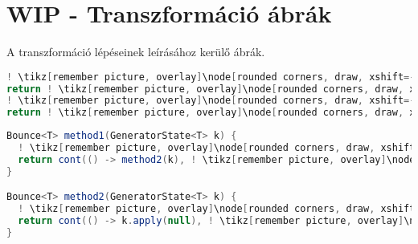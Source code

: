 \chapter*{WIP - Transzformáció ábrák}

A transzformáció lépéseinek leírásához kerülő ábrák.

\begin{center}
\begin{mdframed}
\begin{minipage}[t]{0.4\textwidth}
\begin{lstlisting}[language=Java, numbers=none, breaklines=true]
! \tikz[remember picture, overlay]\node[rounded corners, draw, xshift=-0.1cm, inner sep=5pt, anchor=west] {Kódrészlet \#1}; \vspace*{0.5cm} ! 
return ! \tikz[remember picture, overlay]\node[rounded corners, draw, xshift=-0.1cm, inner sep=5pt, anchor=west, yshift=0.1cm] {Kifejezés \#1}; \vspace*{0.3cm} !
! \tikz[remember picture, overlay]\node[rounded corners, draw, xshift=-0.1cm, inner sep=5pt, anchor=west] {Kódrészlet \#2}; \vspace*{0.5cm} ! 
return ! \tikz[remember picture, overlay]\node[rounded corners, draw, xshift=-0.1cm, inner sep=5pt, anchor=west, yshift=0.1cm] {Kifejezés \#2}; \vspace*{0.3cm} !
\end{lstlisting}
\end{minipage} 
\begin{minipage}[t]{0.6\textwidth}
\begin{lstlisting}[language=Java, numbers=none, breaklines=true]
Bounce<T> method1(GeneratorState<T> k) {
  ! \tikz[remember picture, overlay]\node[rounded corners, draw, xshift=-0.1cm, inner sep=5pt, anchor=west] {Kódrészlet \#1}; \vspace*{0.3cm} !
  return cont(() -> method2(k), ! \tikz[remember picture, overlay]\node[rounded corners, draw, xshift=-0.1cm, inner sep=5pt, anchor=west, yshift=0.1cm] {Kifejezés \#1}; \vspace*{0.2cm} \hspace*{1.75cm} !);
}

Bounce<T> method2(GeneratorState<T> k) {
  ! \tikz[remember picture, overlay]\node[rounded corners, draw, xshift=-0.1cm, inner sep=5pt, anchor=west] {Kódrészlet \#2}; \vspace*{0.3cm} !
  return cont(() -> k.apply(null), ! \tikz[remember picture, overlay]\node[rounded corners, draw, xshift=-0.2cm, inner sep=5pt, anchor=west, yshift=0.1cm] {Kifejezés \#2}; \vspace*{0.2cm} \hspace*{1.6cm} !);
}
\end{lstlisting} 
\end{minipage}
\end{mdframed}
\end{center}


